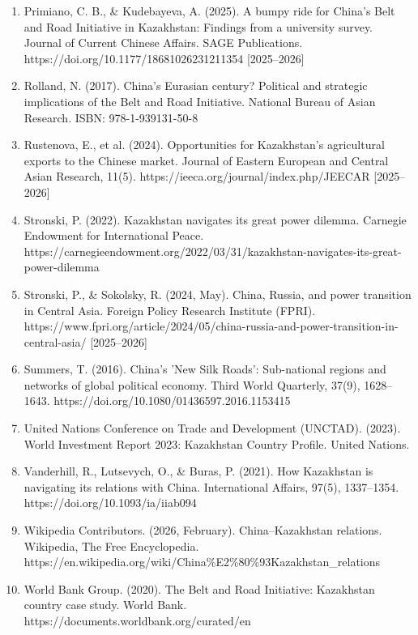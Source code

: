 \documentclass[12pt]{article}
\begin{document}
\begin{enumerate}[leftmargin=*]
\item Primiano, C. B., \& Kudebayeva, A. (2025). A bumpy ride for China's Belt and Road Initiative in Kazakhstan: Findings from a university survey. Journal of Current Chinese Affairs. SAGE Publications. https://doi.org/10.1177/18681026231211354 [2025–2026]
\item Rolland, N. (2017). China's Eurasian century? Political and strategic implications of the Belt and Road Initiative. National Bureau of Asian Research. ISBN: 978-1-939131-50-8
\item Rustenova, E., et al. (2024). Opportunities for Kazakhstan's agricultural exports to the Chinese market. Journal of Eastern European and Central Asian Research, 11(5). https://ieeca.org/journal/index.php/JEECAR [2025–2026]
\item Stronski, P. (2022). Kazakhstan navigates its great power dilemma. Carnegie Endowment for International Peace. https://carnegieendowment.org/2022/03/31/kazakhstan-navigates-its-great-power-dilemma
\item Stronski, P., \& Sokolsky, R. (2024, May). China, Russia, and power transition in Central Asia. Foreign Policy Research Institute (FPRI). https://www.fpri.org/article/2024/05/china-russia-and-power-transition-in-central-asia/ [2025–2026]
\item Summers, T. (2016). China's 'New Silk Roads': Sub-national regions and networks of global political economy. Third World Quarterly, 37(9), 1628–1643. https://doi.org/10.1080/01436597.2016.1153415
\item United Nations Conference on Trade and Development (UNCTAD). (2023). World Investment Report 2023: Kazakhstan Country Profile. United Nations.
\item Vanderhill, R., Lutsevych, O., \& Buras, P. (2021). How Kazakhstan is navigating its relations with China. International Affairs, 97(5), 1337–1354. https://doi.org/10.1093/ia/iiab094
\item Wikipedia Contributors. (2026, February). China–Kazakhstan relations. Wikipedia, The Free Encyclopedia. https://en.wikipedia.org/wiki/China\%E2\%80\%93Kazakhstan\_relations
\item World Bank Group. (2020). The Belt and Road Initiative: Kazakhstan country case study. World Bank. https://documents.worldbank.org/curated/en
\end{enumerate}
\end{document}
